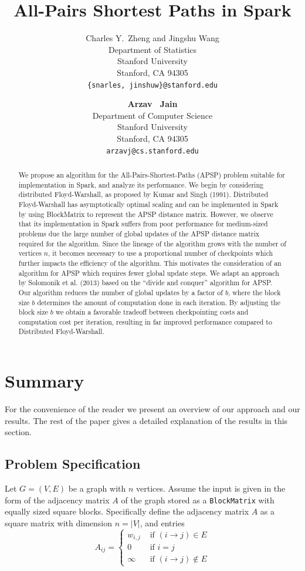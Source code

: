 \documentclass{article} %
\title{All-Pairs Shortest Paths in Spark}
\author{
Charles Y.~Zheng and Jingshu Wang\\
Department of Statistics\\
Stanford University\\
Stanford, CA 94305 \\
\texttt{\{snarles, jinshuw\}@stanford.edu} \\
\and
\textbf{Arzav ~Jain} \\
Department of Computer Science\\
Stanford University\\
Stanford, CA 94305 \\
\texttt{arzavj@cs.stanford.edu} \\
}
\begin{document}
\maketitle

\begin{abstract}
We propose an algorithm for the All-Pairs-Shortest-Paths (APSP)
problem suitable for implementation in Spark, and analyze its
performance.  We begin by considering distributed Floyd-Warshall, as
proposed by Kumar and Singh (1991).  Distributed Floyd-Warshall has
asymptotically optimal scaling and can be implemented in Spark by
using BlockMatrix to represent the APSP distance matrix.  However, we
observe that its implementation in Spark suffers from poor performance
for medium-sized problems due the large number of global updates of
the APSP distance matrix required for the algorithm.  Since the
lineage of the algorithm grows with the number of vertices $n$, it
becomes necessary to use a proportional number of checkpoints which
further impacts the efficiency of the algorithm. This motivates the
consideration of an algorithm for APSP which requires fewer global
update steps.  We adapt an approach by Solomonik et al. (2013) based
on the ``divide and conquer'' algorithm for APSP.  Our algorithm
reduces the number of global updates by a factor of $b$, where the
block size $b$ determines the amount of computation done in each
iteration.  By adjusting the block size $b$ we obtain a favorable
tradeoff between checkpointing costs and computation cost per
iteration, resulting in far improved performance compared to
Distributed Floyd-Warshall.
\end{abstract}

\section{Summary}

For the convenience of the reader we present an overview of our
approach and our results.  The rest of the paper gives a detailed
explanation of the results in this section.

\subsection{Problem Specification}

Let $G = (V, E)$ be a graph with $n$ vertices.  Assume the input is
given in the form of the adjacency matrix $A$ of the graph stored as a
{\tt BlockMatrix} with equally sized square blocks.  Specifically
define the adjacency matrix $A$ as a square matrix with dimension $n =
|V|$, and entries
\[
A_{ij} = 
\begin{cases}
w_{i, j} &\text{ if } (i \to j) \in E\\
0 &\text{ if } i = j\\
\infty &\text{ if } (i \to j) \notin E
\end{cases}
\]
\end{document}
